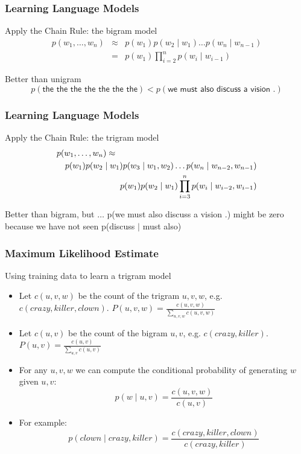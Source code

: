 \begin{frame}
\frametitle{Learning Language Models}
\begin{block}{Apply the Chain Rule: the bigram model}
\begin{eqnarray*}
p(w_1, \ldots, w_n) &\approx& p(w_1) p(w_2 \mid w_1) \ldots p(w_n \mid w_{n-1}) \\
&=& p(w_1) \prod_{i=2}^n p(w_i \mid w_{i-1})
\end{eqnarray*}
\end{block}
\pause
\begin{block}{Better than unigram}
\[ p(\textsf{the the the the the the the}) < p(\textsf{we must also discuss a vision .}) \]
\end{block}
\end{frame}

\begin{frame}
\frametitle{Learning Language Models}
\begin{block}{Apply the Chain Rule: the trigram model}
\begin{eqnarray*}
\lefteqn{p(w_1, \ldots, w_n) \approx} \\
&& p(w_1) p(w_2 \mid w_1) p(w_3 \mid w_1, w_2) \ldots p(w_n \mid w_{n-2}, w_{n-1}) \\
&& p(w_1) p(w_2 \mid w_1) \prod_{i=3}^n p(w_i \mid w_{i-2}, w_{i-1})
\end{eqnarray*}
\end{block}
\pause
\begin{block}{Better than bigram, but $\ldots$}
p(\textsf{we must also discuss a vision .}) might be zero because we have not seen p(discuss $\mid$ must also)
\end{block}
\end{frame}

\begin{frame}
\frametitle{Maximum Likelihood Estimate}
\begin{block}{Using training data to learn a trigram model}
\begin{itemize}[<+->]
\item Let $c(u,v,w)$ be the count of the trigram $u,v,w$, e.g. $c(crazy,killer,clown)$. $P(u,v,w) = \frac{c(u,v,w)}{\sum_{u,v,w} c(u,v,w)}$
\item Let $c(u,v)$ be the count of the bigram $u,v$, e.g. $c(crazy,killer)$. $P(u,v) = \frac{c(u,v)}{\sum_{u,v} c(u,v)}$
\item For any $u,v,w$ we can compute the conditional probability of generating $w$ given $u,v$:
\[ p(w \mid u,v) = \frac{c(u,v,w)}{c(u,v)} \]
\item For example:
\[ p(clown \mid crazy, killer) = \frac{c(crazy, killer, clown)}{c(crazy, killer)} \]
\end{itemize}

\end{block}
\end{frame}

